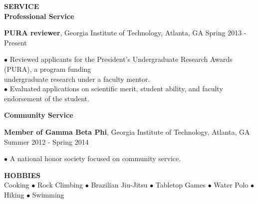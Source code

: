 \documentclass[10pt]{article}
\newenvironment{changemargin}[2]{%
  \list{}{\rightmargin#2\leftmargin#1
    \parsep=0pt\topsep=1pt\partopsep=0pt}
\item[]} {\endlist}
\newenvironment{indentmore}{\begin{changemargin}{10pt}{0cm}}{\end{changemargin}}
\begin{document}
%
%
%
%

\textbf{\large SERVICE}\\
{\bf Professional Service}
\begin{indentmore}
{\bf PURA reviewer}, Georgia Institute of Technology, Atlanta, GA \hfill Spring 2013 - Present
\begin{indentmore}
$\bullet$ Reviewed applicants for the President's Undergraduate Research Awards (PURA), a program funding \\ \hspace*{5pt} undergraduate research under a faculty mentor.\\
$\bullet$ Evaluated applications on scientific merit, student ability, and faculty endorsement of the student.\\
\end{indentmore}
\end{indentmore}


{\bf Community Service}
\begin{indentmore}
{\bf Member of Gamma Beta Phi}, Georgia Institute of Technology, Atlanta, GA \hfill Summer 2012 - Spring 2014
\begin{indentmore}
$\bullet$ A national honor society focused on community service. \\
\end{indentmore}
\end{indentmore}

\textbf{\large HOBBIES} \\
 Cooking $\bullet$ Rock Climbing $\bullet$ Brazilian Jiu-Jitsu $\bullet$  Tabletop Games $\bullet$ Water Polo $\bullet$ Hiking $\bullet$ Swimming
\end{document}
